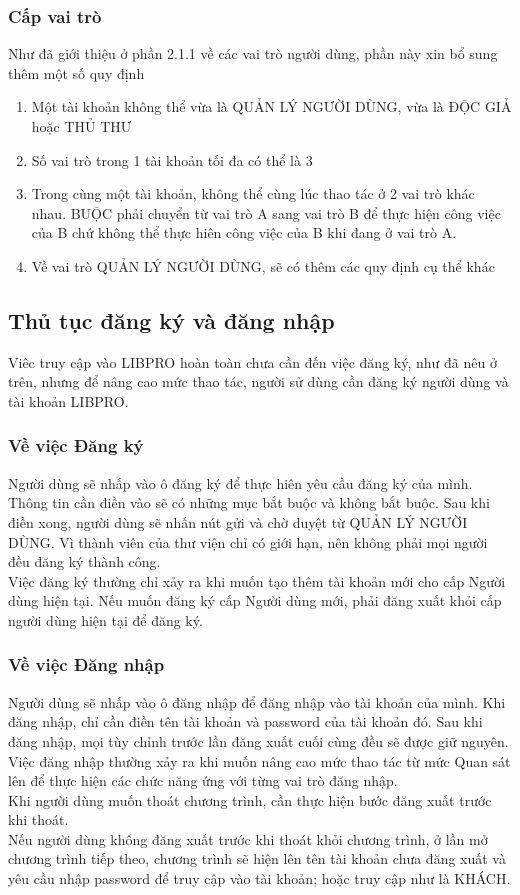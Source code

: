 \documentclass[12pt,a4paper]{report}
\begin{document}
		\subsubsection{Cấp vai trò}
		Như đã giới thiệu ở phần 2.1.1 về các vai trò người dùng, phần này xin bổ sung thêm một số quy định
		\begin{enumerate}
			\item Một tài khoản không thể vừa là QUẢN LÝ NGƯỜI DÙNG, vừa là ĐỘC GIẢ hoặc THỦ THƯ
			\item Số vai trò trong 1 tài khoản tối đa có thể là 3
			\item Trong cùng một tài khoản, không thể cùng lúc thao tác ở 2 vai trò khác nhau. BUỘC phải chuyển từ vai trò A sang vai trò B để thực hiện công việc của B chứ không thể thực hiên công việc của B khi đang ở vai trò A.
			\item Về vai trò QUẢN LÝ NGƯỜI DÙNG, sẽ có thêm các quy định cụ thể khác
		\end{enumerate}
	\subsection{Thủ tục đăng ký và đăng nhập}
	Viêc truy cập vào LIBPRO hoàn toàn chưa cần đến việc đăng ký, như đã nêu ở trên, nhưng để nâng cao mức thao tác, người sử dùng cần đăng ký người dùng và tài khoản LIBPRO.\\
		\subsubsection{Về việc Đăng ký}
		Người dùng sẽ nhấp vào ô đăng ký để thực hiên yêu cầu đăng ký của mình. Thông tin cần điền vào sẽ có những mục bắt buộc và không bắt buộc. Sau khi điền xong, người dùng sẽ nhấn nút gửi và chờ duyệt từ QUẢN LÝ NGƯỜI DÙNG. Vì thành viên của thư viện chỉ có giới hạn, nên không phải mọi người đều đăng ký thành công.\\
		Việc đăng ký thường chỉ xảy ra khi muốn tạo thêm tài khoản mới cho cấp Người dùng hiện tại. Nếu muốn đăng ký cấp Người dùng mới, phải đăng xuất khỏi cấp người dùng hiện tại để đăng ký.\\

		\subsubsection{Về việc Đăng nhập}
		Người dùng sẽ nhấp vào ô đăng nhập để đăng nhập vào tài khoản của mình. Khi đăng nhập, chỉ cần điền tên tài khoản và password của tài khoản đó. Sau khi đăng nhập, mọi tùy chỉnh trước lần đăng xuất cuối cùng đều sẽ được giữ nguyên.\\
		Việc đăng nhập thường xảy ra khi muốn nâng cao mức thao tác từ mức Quan sát lên để thực hiện các chức năng ứng với từng vai trò đăng nhập.\\
		Khi người dùng muốn thoát chương trình, cần thực hiện bước đăng xuất trước khi thoát.\\
		Nếu người dùng không đăng xuất trước khi thoát khỏi chương trình, ở lần mở chương trình tiếp theo, chương trình sẽ hiện lên tên tài khoản chưa đăng xuất và yêu cầu nhập password để truy cập vào tài khoản; hoặc truy cập như là KHÁCH.\\
\end{document}
